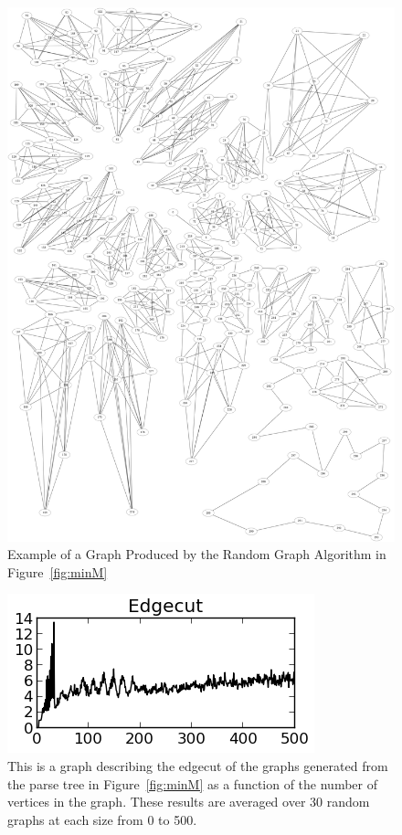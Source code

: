 \documentclass{article}
\begin{document}
\begin{figure}
\begin{centering}
  \includegraphics[scale=0.165]{minMGraph.png}
  \caption{Example of a Graph Produced by the Random Graph Algorithm in Figure~\ref{fig:minM}}
  \label{fig:minMGraph}
\end{centering}
\end{figure}

\begin{figure}
\begin{centering}
  \includegraphics[scale=1]{minM2-Edgecut.png}
  \caption{This is a graph describing the edgecut of the graphs generated from the parse tree in Figure~\ref{fig:minM} as a function of the number of vertices in the graph. 
    These results are averaged over 30 random graphs at each size from 0 to 500.}
  \label{fig:minM-graph}
\end{centering}
\end{figure}
\end{document}
